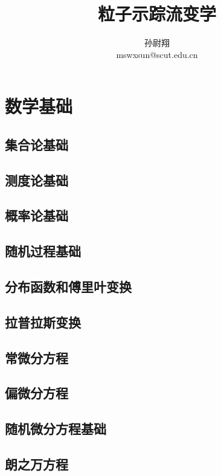 \documentclass[zihao=-4,linespread=1.5,a4paper,heading=true,twoside]{ctexbook}
\title{粒子示踪流变学}
\author{孙尉翔\\mswxsun@scut.edu.cn}
\theoremstyle{definition}
\theoremstyle{plain}
\begin{document}
\tableofcontents


\part{数学基础}

\chapter{集合论基础}


\chapter{测度论基础}




\chapter{概率论基础}




\chapter{随机过程基础}


\chapter{分布函数和傅里叶变换}


\chapter{拉普拉斯变换}
\chapter{常微分方程}

\chapter{偏微分方程}


\chapter{随机微分方程基础}

\chapter{朗之万方程}
\end{document}
